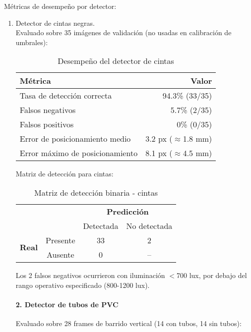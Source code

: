 \noindent
Métricas de desempeño por detector:\\
\noindent
\begin{enumerate}
    \item Detector de cintas negras.\\
\noindent
Evaluado sobre 35 imágenes de validación (no usadas en calibración de umbrales):

\begin{table}[H]
\centering
\begin{tabular}{|l|r|}
\hline
\textbf{Métrica} & \textbf{Valor} \\ \hline
Tasa de detección correcta & 94.3\% (33/35) \\ \hline
Falsos negativos & 5.7\% (2/35) \\ \hline
Falsos positivos & 0\% (0/35) \\ \hline
Error de posicionamiento medio & 3.2 px ($\approx$1.8 mm) \\ \hline
Error máximo de posicionamiento & 8.1 px ($\approx$4.5 mm) \\ \hline
\end{tabular}
\caption{Desempeño del detector de cintas}
\label{tab:metricas_cintas}
\end{table}

Matriz de detección para cintas:

\begin{table}[H]
\centering
\begin{tabular}{cc|c|c|}
\cline{3-4}
& & \multicolumn{2}{c|}{\textbf{Predicción}} \\ \cline{3-4}
& & Detectada & No detectada \\ \hline
\multicolumn{1}{|c|}{\multirow{2}{*}{\textbf{Real}}} & Presente & 33 & 2 \\ \cline{2-4}
\multicolumn{1}{|c|}{} & Ausente & 0 & -- \\ \hline
\end{tabular}
\caption{Matriz de detección binaria - cintas}
\label{tab:confusion_cintas}
\end{table}

\noindent
Los 2 falsos negativos ocurrieron con iluminación $<$700 lux, por debajo del rango operativo especificado (800-1200 lux).

\paragraph{2. Detector de tubos de PVC}
Evaluado sobre 28 frames de barrido vertical (14 con tubos, 14 sin tubos):


\end{enumerate}
